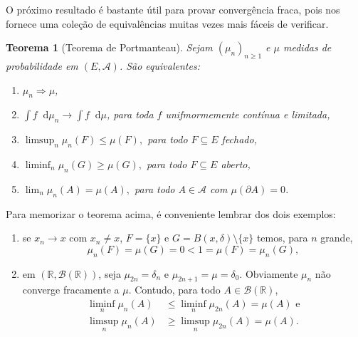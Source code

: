 \documentclass[reqno, final]{book}
\newcommand*\1{\mathds{1}}
\newtheorem{theorem}{Teorema}[section]
\renewcommand*\d{\mathop{}\!\mathrm{d}}
\begin{document}
O próximo resultado é bastante útil para provar convergência fraca, pois nos fornece uma coleção de equivalências muitas vezes mais fáceis de verificar.

\begin{theorem}[Teorema de Portmanteau]
  \label{t:portmanteau}
  Sejam $(\mu_n)_{n \geq 1}$ e $\mu$ medidas de probabilidade em $(E, \mathcal{A})$.
  São equivalentes:
  \begin{enumerate}[\quad a)]
  \item[a)] $\mu_n \Rightarrow \mu$,
  \item[a')] $\int f \d \mu_n \to \int f \d \mu$, para toda $f$ unifmormemente contínua e limitada,
  \item[b)] $\limsup_n \mu_n(F) \leq \mu(F),$ para todo $F \subseteq E$ fechado,
  \item[b')] $\liminf_n \mu_n(G) \geq \mu(G),$ para todo $F \subseteq E$ aberto,
  \item[c)] $\lim_n \mu_n(A) = \mu(A),$ para todo $A \in \mathcal{A}$ com $\mu(\partial A) = 0$.
  \end{enumerate}
\end{theorem}

Para memorizar o teorema acima, é conveniente lembrar dos dois exemplos:
\begin{enumerate}[\quad i)]
  \item se $x_n \to x$ com $x_n \neq x$, $F = \{x\}$ e $G = B(x, \delta) \setminus \{x\}$ temos, para $n$ grande,
    \begin{equation}
      \mu_n(F) = \mu(G) = 0 < 1 = \mu(F) = \mu_n(G),
    \end{equation}
  \item em $(\mathbb{R},\mathcal{B}(\mathbb{R}))$, seja $\mu_{2n} = \delta_n$ e $\mu_{2n+1} = \mu = \delta_0$.
    Obviamente $\mu_n$ não converge fracamente a $\mu$. Contudo, para todo $A \in \mathcal{B}(\mathbb{R})$,
    \begin{equation}
      \begin{split}
        \liminf_n \mu_n (A) & \leq \liminf_n \mu_{2n}(A) = \mu(A) \text{ e}\\
        \limsup_n \mu_n (A) & \geq \limsup_n \mu_{2n}(A) = \mu(A).
      \end{split}
    \end{equation}
\end{enumerate}
\end{document}
